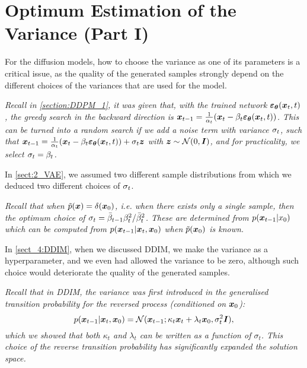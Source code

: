 \section{Optimum Estimation of the Variance (Part I)}

For the diffusion models, how to choose the variance as one of its parameters is a critical issue, as the quality of the generated samples strongly depend on the different choices of the variances that are used for the model. 
\begin{myquote}
    \footnotesize{\textit{Recall in \cref{section:DDPM_1}, it was given that, with the trained network $\bm{\varepsilon}_{\bm{\theta}}(\bm{x}_t,t)$, the greedy search in the backward direction is $\bm{x}_{t-1}=\frac{1}{\alpha_t}(\bm{x}_{t}-\beta_t \bm{\varepsilon}_{\bm{\theta}}(\bm{x}_t,t))$. This can be turned into a random search if we add a noise term with variance $\sigma_t$, such that $\bm{x}_{t-1}=\frac{1}{\alpha_t}(\bm{x}_{t}-\beta_t \bm{\varepsilon}_{\bm{\theta}}(\bm{x}_t,t))+\sigma_t \bm{z}$ with $\bm{z}\sim\mathcal{N}(0,\bm{I})$, and for practicality, we select $\sigma_t=\beta_t$. }}
\end{myquote}
In \cref{sect:2_VAE}, we assumed two different sample distributions from which we deduced two different choices of $\sigma_t$.
\begin{myquote}
    \footnotesize{\textit{Recall that when $\tilde{p}(\bm{x})=\delta (\bm{x}_0)$, i.e. when there exists only a single sample, then the optimum choice of $\sigma_t=\bar{\beta}_{t-1}\beta_t^2/\bar{\beta}_t^2$. These are determined from $p(\bm{x}_{t-1}|x_0)$ which can be computed from $p(\bm{x}_{t-1}|\bm{x}_{t},\bm{x}_0)$ when $\tilde{p}(\bm{x}_0)$ is known.
    }}
\end{myquote}
In \cref{sect_4:DDIM}, when we discussed DDIM, we make the variance as a hyperparameter, and we even had allowed the variance to be zero, although such choice would deteriorate the quality of the generated samples.
\begin{myquote}
     \footnotesize{\textit{Recall that in DDIM, the variance was first introduced in the generalised transition probability for the reversed process (conditioned on $\bm{x}_0$):
\begin{equation*}
    p(\bm{x}_{t-1}|\bm{x}_{t},\bm{x}_0)=\mathcal{N}(\bm{x}_{t-1};\kappa_t\bm{x}_{t}+\lambda_t\bm{x}_0,\sigma_t^2\bm{I}),
\end{equation*}
which we showed that both $\kappa_t$ and $\lambda_t$ can be written as a function of $\sigma_t$. This choice of the reverse transition probability has significantly expanded the solution space.
     }}
\end{myquote}
